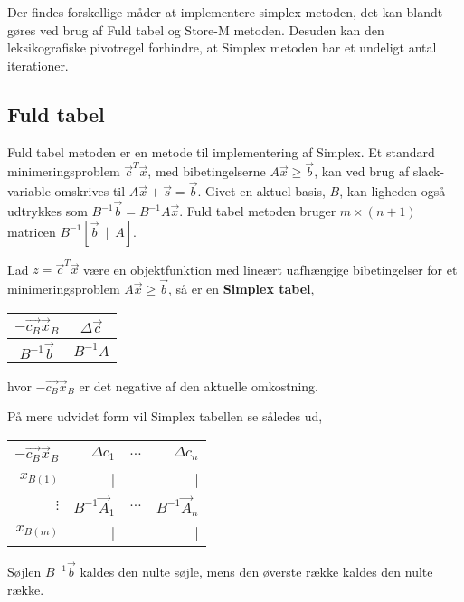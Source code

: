Der findes forskellige måder at implementere simplex metoden, det kan blandt gøres ved brug af Fuld tabel og Store-M metoden. Desuden kan den leksikografiske pivotregel forhindre, at Simplex metoden har et undeligt antal iterationer. 

\subsection{Fuld tabel}
Fuld tabel metoden er en metode til implementering af Simplex. Et standard minimeringsproblem $\vec{c}^T\vec{x}$, med bibetingelserne $A\vec{x} \geq \vec{b}$, kan ved brug af slack-variable omskrives til $A\vec{x}+\vec{s}=\vec{b}$. Givet en aktuel basis, $B$, kan ligheden også udtrykkes som  $B^{-1}\vec{b}=B^{-1}A\vec{x}$. Fuld tabel metoden bruger $m \times (n+1)$ matricen $B^{-1}[\vec{b} \ \mid \ A]$.\\

\begin{defn}
Lad $z=\vec{c}^T\vec{x}$ være en objektfunktion med lineært uafhængige bibetingelser for et minimeringsproblem $A\vec{x} \geq \vec{b}$, så er en \textbf{Simplex tabel},\\
\begin{center}
\begin{tabular}{| c | c |}
  \hline
  $-\vec{c_B}\vec{x}_B$&$\Delta\vec{c}$ \\ \hline			
  $B^{-1}\vec{b}$ & $B^{-1}A$ \\ \hline
\end{tabular}
\end{center}
hvor $-\vec{c_B}\vec{x}_B$ er det negative af den aktuelle omkostning. 
\end{defn}


På mere udvidet form vil Simplex tabellen se således ud,
\begin{center}
\begin{tabular}{| r|r r r|}
  \hline	
  $-\vec{c_B}\vec{x}_B$&$\Delta c_1 $ & $\dots$ &$\Delta c_n$\\ \hline	
  $x_{B(1)}$ &	| & & |\\	
  $\vdots$  & $B^{-1}\vec{A}_1$ & $\hdots$ & $B^{-1}\vec{A}_n$\\
   $x_{B(m)}$ &	| & & |\\
   \hline
\end{tabular}
\end{center}
Søjlen $B^{-1}\vec{b}$ kaldes den nulte søjle, mens den øverste række kaldes den nulte række.

